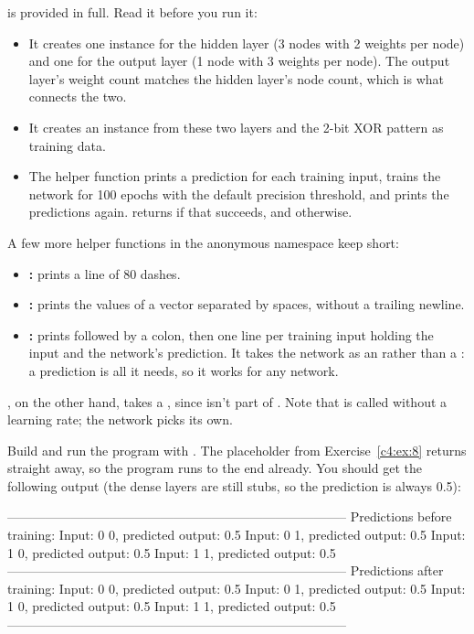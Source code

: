 \label{c4:ex:9}
 is provided in full. Read it before you run it:
\begin{itemize}
  \item It creates one  instance for the hidden layer (3 nodes with 2
    weights per node) and one for the output layer (1 node with 3 weights per node). The output
    layer's weight count matches the hidden layer's node count, which is what connects the two.
  \item It creates an  instance from these two layers and the
    2-bit XOR pattern as training data.
  \item The helper function  prints a prediction for each training input,
    trains the network for 100 epochs with the default precision threshold, and prints the
    predictions again.  returns  if that succeeds, and  otherwise.
\end{itemize}
A few more helper functions in the anonymous namespace keep  short:
\begin{itemize}
  \item \textbf{:} prints a line of 80 dashes.
  \item \textbf{:} prints the values of a vector separated by spaces,
    without a trailing newline.
  \item \textbf{:} prints  followed
    by a colon, then one line per training input holding the input and the network's prediction.
    It takes the network as an  rather than a
    : a prediction is all it needs, so it works for any network.
\end{itemize}
, on the other hand, takes a , since  isn't part
of . Note that  is called without a learning rate;
the network picks its own.

Build and run the program with . The placeholder  from
Exercise~\ref{c4:ex:8} returns  straight away, so the program runs to the end already.
You should get the following output (the dense layers are still stubs, so the prediction is always
0.5):

\begin{console}
--------------------------------------------------------------------------------
Predictions before training:
Input: 0 0, predicted output: 0.5
Input: 0 1, predicted output: 0.5
Input: 1 0, predicted output: 0.5
Input: 1 1, predicted output: 0.5
--------------------------------------------------------------------------------
Predictions after training:
Input: 0 0, predicted output: 0.5
Input: 0 1, predicted output: 0.5
Input: 1 0, predicted output: 0.5
Input: 1 1, predicted output: 0.5
--------------------------------------------------------------------------------
\end{console}

